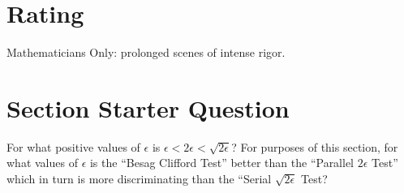 \documentclass[12pt]{article}
\begin{document}
\myheader \mytitle

\hr


\hr

\usefirefox

\hr



\section*{Rating} %
Mathematicians Only:  prolonged scenes of intense rigor.

\hr

\section*{Section Starter Question} For what positive values of \(
\epsilon \) is \( \epsilon < 2 \epsilon < \sqrt{2 \epsilon} \)?  For
purposes of this section, for what values of \( \epsilon \) is the
``Besag Clifford Test'' better than the ``Parallel \( 2 \epsilon \)
Test'' which in turn is more discriminating than the ``Serial \( \sqrt{2
\epsilon} \) Test?

\hr

\end{document}
